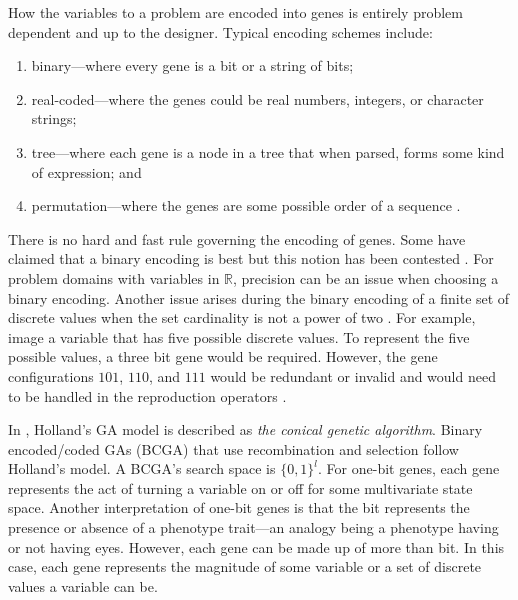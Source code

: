 How the variables to a problem are encoded into genes is entirely problem dependent and up to the designer. Typical encoding schemes include:
\begin{enumerate}
 \item binary---where every gene is a bit or a string of bits;
 \item real-coded---where the genes could be real numbers, integers, or character strings;
 \item tree---where each gene is a node in a tree that when parsed, forms some kind of expression; and
 \item permutation---where the genes are some possible order of a sequence \cite{encoding_schemes}.
\end{enumerate}
There is no hard and fast rule governing the encoding of genes. Some have claimed that a binary encoding is best but this notion has been contested \cite{ColinReeves}\cite{Herrera}. For problem domains with variables in $\mathbb{R}$, precision can be an issue when choosing a binary encoding. Another issue arises during the binary encoding of a finite set of discrete values when the set cardinality is not a power of two \cite{Herrera}. For example, image a variable that has five possible discrete values. To represent the five possible values, a three bit gene would be required. However, the gene configurations $101$, $110$, and $111$ would be redundant or invalid and would need to be handled in the reproduction operators \cite{Whitley94agenetic}.     

In \cite{Whitley94agenetic}, Holland's GA model is described as \textit{the conical genetic algorithm}. Binary encoded/coded GAs (BCGA) that use recombination and selection follow Holland's model. A BCGA's search space is $\{0,1\}^l$. For one-bit genes, each gene represents the act of turning a variable on or off for some multivariate state space. Another interpretation of one-bit genes is that the bit represents the presence or absence of a phenotype trait---an analogy being a phenotype having or not having eyes. However, each gene can be made up of more than bit. In this case, each gene represents the magnitude of some variable or a set of discrete values a variable can be.

